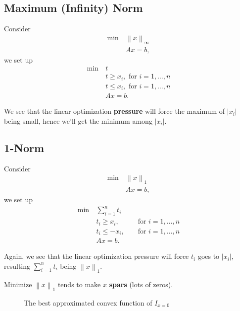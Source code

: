 \subsection{Maximum (Infinity) Norm}
Consider
\begin{align*}
	\min~ & \left\lVert x\right\rVert_{\infty } \\
	      & Ax = b,
\end{align*}
we set up
\begin{align*}
	\min~ & t                                      \\
	      & t\geq x_i,\text{ for }i = 1, \ldots ,n \\
	      & t\leq x_i,\text{ for }i = 1, \ldots ,n \\
	      & Ax = b.
\end{align*}

We see that the linear optimization \textbf{pressure} will force the maximum of \(\left\vert x_i \right\vert \) being small, hence
we'll get the minimum among \(\left\vert x_i \right\vert \).

\subsection{1-Norm}
Consider
\begin{align*}
	\min~ & \left\lVert x\right\rVert_1 \\
	      & Ax = b,
\end{align*}
we set up
\[
	\begin{alignedat}{3}
		\min~ & \sum\limits_{i=1}^{n} t_i                \\
		& t_i\geq x_i, && \text{ for }i = 1, \ldots ,n  \\
		& t_i\leq -x_i, && \text{ for }i = 1, \ldots ,n \\
		& Ax = b.
	\end{alignedat}
\]

Again, we see that the linear optimization pressure will force \(t_i\) goes to \(\left\vert x_i \right\vert \), resulting
\(\sum\limits_{i=1}^{n} t_i\) being \(\left\lVert x\right\rVert_1\).

\begin{remark}
	Minimize \(\left\lVert x\right\rVert_1\) tends to make \(x\) \textbf{spars} (lots of zeros).
	\begin{figure}[H]
		\centering
		\caption{The best approximated convex function of \(I_{x = 0}\) }
		\label{fig:1-norm}
	\end{figure}
\end{remark}
